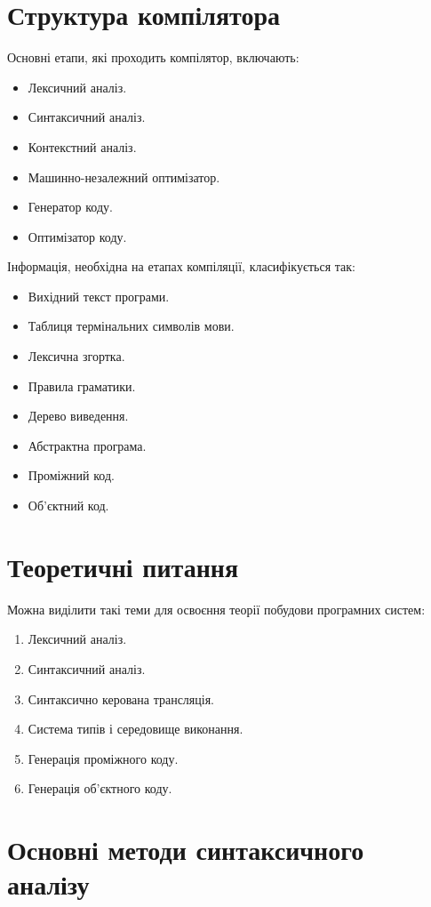 \documentclass{memoir}
\begin{document}
\section{Структура компілятора}
Основні етапи, які проходить компілятор, включають:
\begin{itemize}
    \item Лексичний аналіз.
    \item Синтаксичний аналіз.
    \item Контекстний аналіз.
    \item Машинно-незалежний оптимізатор.
    \item Генератор коду.
    \item Оптимізатор коду.
\end{itemize}
Інформація, необхідна на етапах компіляції, класифікується так:
\begin{itemize}
    \item Вихідний текст програми.
    \item Таблиця термінальних символів мови.
    \item Лексична згортка.
    \item Правила граматики.
    \item Дерево виведення.
    \item Абстрактна програма.
    \item Проміжний код.
    \item Об’єктний код.
\end{itemize}

\section{Теоретичні питання}
Можна виділити такі теми для освоєння теорії побудови програмних систем:
\begin{enumerate}
    \item Лексичний аналіз.
    \item Синтаксичний аналіз.
    \item Синтаксично керована трансляція.
    \item Система типів і середовище виконання.
    \item Генерація проміжного коду.
    \item Генерація об’єктного коду.
\end{enumerate}

\section{Основні методи синтаксичного аналізу}
\end{document}
